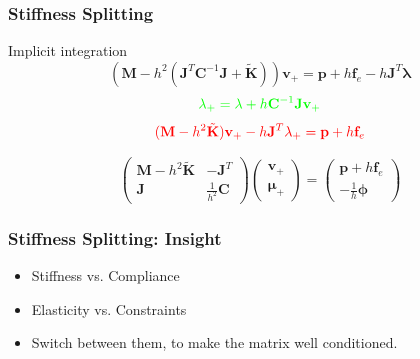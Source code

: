\documentclass[serif,mathserif]{beamer}
\newcommand{\BOLD}[1]{\mathbf{#1}}
\begin{document}
\begin{frame}
 \frametitle{Stiffness Splitting}
  Implicit integration
  \begin{equation*}
   (\BOLD{M}-h^2(\BOLD{J}^T\BOLD{C}^{-1}\BOLD{J}+\tilde{\BOLD{K}}))\BOLD{v}_+=\BOLD{p}+h\BOLD{f}_e-h\BOLD{J}^T\BOLD{\lambda}
  \end{equation*}
  \begin{equation*}
   \color{green}\BOLD{\lambda}_+ = \BOLD{\lambda}+h\BOLD{C}^{-1}\BOLD{Jv}_+
  \end{equation*}
  \begin{equation*}
   \color{red}(\BOLD{M}-h^2\tilde{\BOLD{K}})\BOLD{v}_+ - h\BOLD{J}^T\BOLD{\lambda}_+=\BOLD{p}+h\BOLD{f}_e
  \end{equation*}
  
  
  \begin{equation*}
   \begin{pmatrix}
    \BOLD{M}-h^2\BOLD{\tilde{K}} & -\BOLD{J}^T \\
    \BOLD{J} & \frac{1}{h^2}\BOLD{C}
   \end{pmatrix}
   \begin{pmatrix}
    \BOLD{v}_+ \\ \BOLD{\mu}_+
   \end{pmatrix}
   =
   \begin{pmatrix}
    \BOLD{p}+h\BOLD{f}_e \\ -\frac{1}{h}\BOLD{\phi}
   \end{pmatrix}
  \end{equation*}
\end{frame}
  
\begin{frame}
 \frametitle{Stiffness Splitting: Insight}
 \begin{itemize}
  \item {\color{red}Stiffness} vs. {\color{green}Compliance}
  \item {\color{red}Elasticity} vs. {\color{green}Constraints}
  \item Switch between them, to make the matrix well conditioned.
 \end{itemize}
\end{frame}


\end{document}
